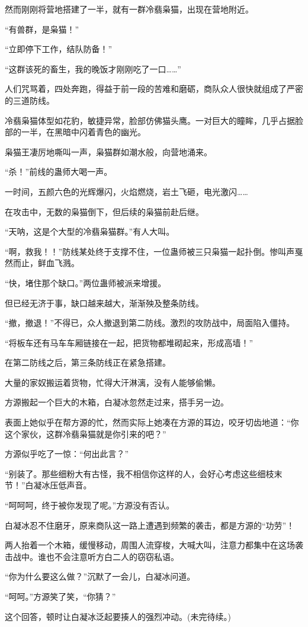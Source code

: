 \begin{this_body}
然而刚刚将营地搭建了一半，就有一群冷翡枭猫，出现在营地附近。

“有兽群，是枭猫！”

“立即停下工作，结队防备！”

“这群该死的畜生，我的晚饭才刚刚吃了一口……”

人们咒骂着，四处奔跑，得益于前一段的苦难和磨砺，商队众人很快就组成了严密的三道防线。

冷翡枭猫体型如花豹，敏捷异常，脸部仿佛猫头鹰。一对巨大的瞳眸，几乎占据脸部的一半，在黑暗中闪着青色的幽光。

枭猫王凄厉地嘶叫一声，枭猫群如潮水般，向营地涌来。

“杀！”前线的蛊师大喝一声。

一时间，五颜六色的光辉爆闪，火焰燃烧，岩土飞砸，电光激闪……

在攻击中，无数的枭猫倒下，但后续的枭猫前赴后继。

“天呐，这是个大型的冷翡枭猫群。”有人大叫。

“啊，救我！！”防线某处终于支撑不住，一位蛊师被三只枭猫一起扑倒。惨叫声戛然而止，鲜血飞溅。

“快，堵住那个缺口。”两位蛊师被派来增援。

但已经无济于事，缺口越来越大，渐渐殃及整条防线。

“撤，撤退！”不得已，众人撤退到第二防线。激烈的攻防战中，局面陷入僵持。

“将板车还有马车车厢链接在一起，把货物都堆砌起来，形成高墙！”

在第二防线之后，第三条防线正在紧急搭建。

大量的家奴搬运着货物，忙得大汗淋漓，没有人能够偷懒。

方源搬起一个巨大的木箱，白凝冰忽然走过来，搭手另一边。

表面上她似乎在帮方源的忙，然而实际上她凑在方源的耳边，咬牙切齿地道：“你这个家伙，这群冷翡枭猫就是你引来的吧？”

方源似乎吃了一惊：“何出此言？”

“别装了。那些细粉大有古怪，我不相信你这样的人，会好心考虑这些细枝末节！”白凝冰压低声音。

“呵呵呵，终于被你发现了呢。”方源没有否认。

白凝冰忍不住磨牙，原来商队这一路上遭遇到频繁的袭击，都是方源的“功劳”！

两人抬着一个木箱，缓慢移动，周围人流穿梭，大喊大叫，注意力都集中在这场袭击战中。谁也不会注意听方白二人的窃窃私语。

“你为什么要这么做？”沉默了一会儿，白凝冰问道。

“呵呵。”方源笑了笑，“你猜？”

这个回答，顿时让白凝冰泛起要揍人的强烈冲动。(未完待续。)

\end{this_body}

